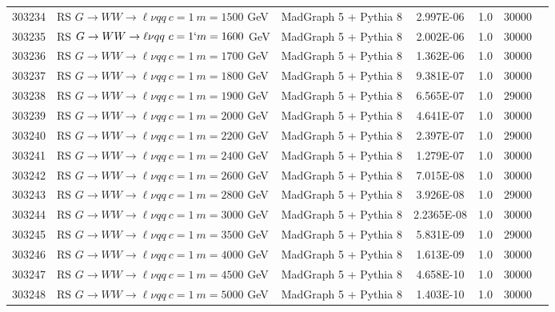 \begin{landscape}
\begin{table}[!htb]
\begin{footnotesize}
\begin{center}
\begin{tabular}{c|l|c|c|c|cr}
  303234 & RS $G \to WW \to \ell\nu qq ~c=1 ~m=1500$ GeV& MadGraph 5 + Pythia 8 & 2.997E-06   &1.0& 30000 \\
  303235 & RS $G \to WW \to \ell\nu qq ~c=1 `m=1600$ GeV& MadGraph 5 + Pythia 8 & 2.002E-06   &1.0& 30000 \\
  303236 & RS $G \to WW \to \ell\nu qq ~c=1 ~m=1700$ GeV& MadGraph 5 + Pythia 8 & 1.362E-06   &1.0& 30000 \\
  303237 & RS $G \to WW \to \ell\nu qq ~c=1 ~m=1800$ GeV& MadGraph 5 + Pythia 8 & 9.381E-07   &1.0& 30000 \\
  303238 & RS $G \to WW \to \ell\nu qq ~c=1 ~m=1900$ GeV& MadGraph 5 + Pythia 8 & 6.565E-07   &1.0& 29000 \\
  303239 & RS $G \to WW \to \ell\nu qq ~c=1 ~m=2000$ GeV& MadGraph 5 + Pythia 8 & 4.641E-07   &1.0& 30000 \\
  303240 & RS $G \to WW \to \ell\nu qq ~c=1 ~m=2200$ GeV& MadGraph 5 + Pythia 8 & 2.397E-07   &1.0& 29000 \\
  303241 & RS $G \to WW \to \ell\nu qq ~c=1 ~m=2400$ GeV& MadGraph 5 + Pythia 8 & 1.279E-07   &1.0& 30000 \\
  303242 & RS $G \to WW \to \ell\nu qq ~c=1 ~m=2600$ GeV& MadGraph 5 + Pythia 8 & 7.015E-08   &1.0& 30000 \\
  303243 & RS $G \to WW \to \ell\nu qq ~c=1 ~m=2800$ GeV& MadGraph 5 + Pythia 8 & 3.926E-08   &1.0& 29000 \\
  303244 & RS $G \to WW \to \ell\nu qq ~c=1 ~m=3000$ GeV& MadGraph 5 + Pythia 8 & 2.2365E-08  &1.0& 30000 \\
  303245 & RS $G \to WW \to \ell\nu qq ~c=1 ~m=3500$ GeV& MadGraph 5 + Pythia 8 & 5.831E-09   &1.0& 29000 \\
  303246 & RS $G \to WW \to \ell\nu qq ~c=1 ~m=4000$ GeV& MadGraph 5 + Pythia 8 & 1.613E-09   &1.0& 30000 \\
  303247 & RS $G \to WW \to \ell\nu qq ~c=1 ~m=4500$ GeV& MadGraph 5 + Pythia 8 & 4.658E-10   &1.0& 30000 \\
  303248 & RS $G \to WW \to \ell\nu qq ~c=1 ~m=5000$ GeV& MadGraph 5 + Pythia 8 & 1.403E-10   &1.0& 30000 \\ 
	\hline\hline
\end{tabular}
\end{center}
\end{footnotesize}
\end{table}


\end{landscape}
